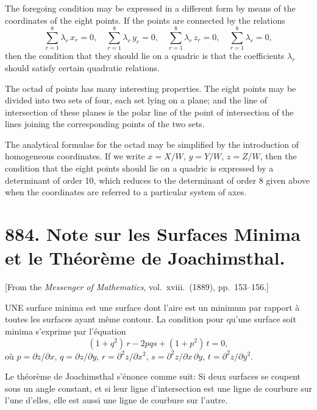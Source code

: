 \documentclass[11pt,a4paper]{book}
\begin{document}
\medskip\noindent
The foregoing condition may be expressed in a different form by means of the coordinates of the eight points. If the points are connected by the relations
\[
\sum_{r=1}^{8} \lambda_{r}\,x_{r} = 0, \quad
\sum_{r=1}^{8} \lambda_{r}\,y_{r} = 0, \quad
\sum_{r=1}^{8} \lambda_{r}\,z_{r} = 0, \quad
\sum_{r=1}^{8} \lambda_{r} = 0,
\]
then the condition that they should lie on a quadric is that the coefficients $\lambda_{r}$ should satisfy certain quadratic relations.

\medskip\noindent
The octad of points has many interesting properties. The eight points may be divided into two sets of four, each set lying on a plane; and the line of intersection of these planes is the polar line of the point of intersection of the lines joining the corresponding points of the two sets.

\medskip\noindent
The analytical formulae for the octad may be simplified by the introduction of homogeneous coordinates. If we write $x = X/W$, $y = Y/W$, $z = Z/W$, then the condition that the eight points should lie on a quadric is expressed by a determinant of order 10, which reduces to the determinant of order 8 given above when the coordinates are referred to a particular system of axes.

\newpage
\section[884]{884. Note sur les Surfaces Minima et le Th\'eor\`eme de Joachimsthal.}
\label{sec:884}

[From the \textit{Messenger of Mathematics}, vol.\ xviii.\ (1889), pp.\ 153--156.]

\medskip\noindent
UNE surface minima est une surface dont l'aire est un minimum par rapport \`a toutes les surfaces ayant m\^eme contour. La condition pour qu'une surface soit minima s'exprime par l'\'equation
\[
(1 + q^{2})\,r - 2pqs + (1 + p^{2})\,t = 0,
\]
o\`u $p = \partial z/\partial x$, $q = \partial z/\partial y$, $r = \partial^{2}z/\partial x^{2}$, $s = \partial^{2}z/\partial x\,\partial y$, $t = \partial^{2}z/\partial y^{2}$.

\medskip\noindent
Le th\'eor\`eme de Joachimsthal s'\'enonce comme suit: Si deux surfaces se coupent sous un angle constant, et si leur ligne d'intersection est une ligne de courbure sur l'une d'elles, elle est aussi une ligne de courbure sur l'autre.
\end{document}
